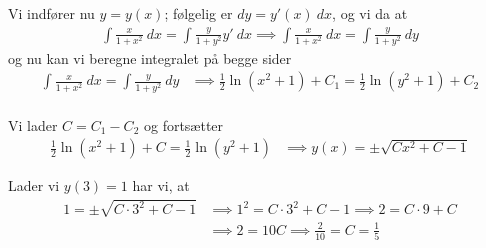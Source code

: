 \documentclass[11pt,a4paper]{article}
\newcommand{\with}[1]{{\ }d#1}
\begin{document}
Vi indfører nu $y = y(x)$; følgelig er $dy = y'(x) \with x$, og vi da at
\begin{align}
    \int \frac{x}{1 + x^2} \with x = \int \frac{y}{1 + y^2} y' \with x
    \implies
    \int \frac{x}{1 + x^2} \with x = \int \frac{y}{1 + y^2} \with y
\end{align}
og nu kan vi beregne integralet på begge sider
\begin{align}
    \int \frac{x}{1 + x^2} \with x = \int \frac{y}{1 + y^2} \with y
    &\implies \frac{1}{2} \ln(x^2 + 1) + C_1 = \frac{1}{2} \ln(y^2 + 1) + C_2 \\
\end{align}

Vi lader $C = C_1 - C_2$ og fortsætter
\begin{align}
    \frac{1}{2} \ln(x^2 + 1) + C = \frac{1}{2} \ln(y^2 + 1)
    &\implies y(x) = \pm \sqrt{Cx^2 + C - 1}
\end{align}

\iffalse

Bemærk, at de ligner meget $\frac{2 \theta}{1 + \theta^2} = \sin \theta$, så
hvis vi benytter integrationsregnereglen $\int k \cdot f(x) \with x = k \cdot
\int f(x) \with x$ kan vi da udnytte dette til vores fordel. Vi har da, at
\begin{align}
    \frac{1}{2} \int \frac{2x}{1 + x^2} \with x =
    \frac{1}{2} \int \frac{2y}{1 + y^2} \with y
    &\implies
    \frac{1}{2} \int \sin x \with x = \frac{1}{2} \int \sin y \with{y} \\
    \implies \frac{C_1 - \cos x}{2} = \frac{C_2 - \cos y}{2}
    &\implies C_1 - \cos x = C_2 - \cos y \\
    \implies \cos y = C_2 - C_1 + \cos x
    &\implies y = \arccos (C_2 - C_1 + \cos x)
\end{align}

Vi lader $C = C_1 - C_2$ og benytter at $\cos \theta = \pm \sqrt{1 - \sin^2
\theta}$. Da har vi, at
\begin{align}
    y = \arctan \left( \pm \sqrt{1 - \sin^2 x} + C \right)
\end{align}

\fi

Lader vi $y(3) = 1$ har vi, at
\begin{align}
    1 = \pm \sqrt{C \cdot 3^2 + C - 1}
    &\implies 1^2 = C \cdot 3^2 + C - 1
    \implies 2 = C \cdot 9 + C \\
    &\implies 2 = 10C
     \implies \frac{2}{10} = C = \frac{1}{5}
\end{align}
\end{document}
